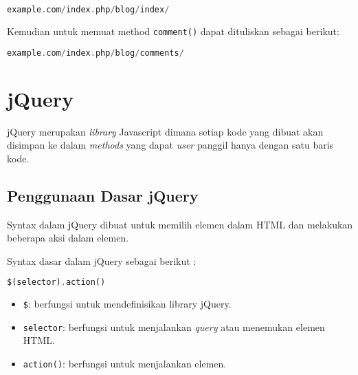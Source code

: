 \begin{lstlisting}[frame=single, language=PHP] 
example.com/index.php/blog/index/
\end{lstlisting}

\noindent Kemudian untuk memuat method \texttt{comment()} dapat dituliskan sebagai berikut:
\begin{lstlisting}[frame=single, language=PHP] 
example.com/index.php/blog/comments/
\end{lstlisting}

\section{jQuery}

%	
jQuery merupakan \textit{library} Javascript dimana setiap kode yang dibuat akan disimpan ke dalam \textit{methods} yang dapat \textit{user} panggil hanya dengan satu baris kode.

\subsection{Penggunaan Dasar jQuery}
Syntax dalam jQuery dibuat untuk memilih elemen dalam HTML dan melakukan beberapa aksi dalam elemen.

Syntax dasar dalam jQuery sebagai berikut :
\begin{lstlisting}[frame=single, language=PHP]
$(selector).action()
\end{lstlisting}
\begin{itemize}
	\item \texttt{\$}: berfungsi untuk mendefinisikan library jQuery.
	\item \texttt{selector}: berfungsi untuk menjalankan \textit{query} atau menemukan elemen HTML.
	\item \texttt{action()}: berfungsi untuk menjalankan elemen.
\end{itemize}

